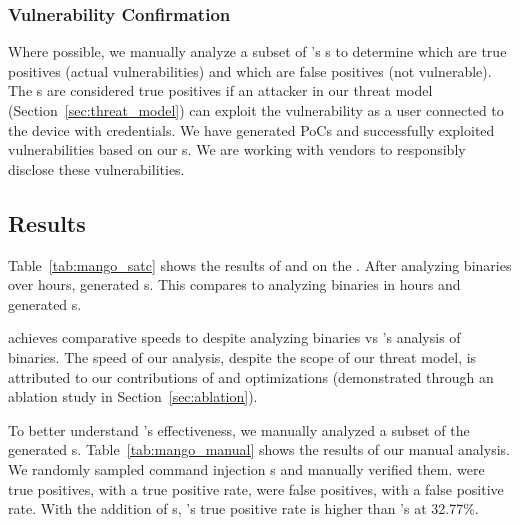 \subsubsection{Vulnerability Confirmation}

Where possible, we manually analyze a subset of \mango's \trupoc{}s to determine which are true positives (actual vulnerabilities) and which are false positives (not vulnerable).
The \trupoc{}s are considered true positives if an attacker in our threat model (Section~\ref{sec:threat_model}) can exploit the vulnerability as a user connected to the device with credentials.
We have generated PoCs and successfully exploited \MangoPoCnum vulnerabilities based on our \trupoc{}s.
We are working with vendors to responsibly disclose these vulnerabilities.

\subsection{\karonteDataset Results}

Table~\ref{tab:mango_satc} shows the results of \mango and \satc on the \karonteDataset.
After analyzing \mangoCompTotalAnalyzedBins binaries over \mangoCompTotalTimeHours hours, \mango generated \mangoCompTotalAlerts \trupoc{}s.
This compares to \satc analyzing \satcAnalyzedBinaries binaries in \satcCompTotalTimeHours hours and generated \satcCompTotalAlerts \trupoc{}s.

\toolname achieves comparative speeds to \satc despite analyzing \mangoKaronteBinaries binaries vs \satc's analysis of \satcAnalyzedBinaries binaries.
The speed of our analysis, despite the scope of our threat model, is attributed to our contributions of \assumed and \rev optimizations (demonstrated through an ablation study in Section~\ref{sec:ablation}).

To better understand \mango{}'s effectiveness, we manually analyzed a subset of the generated \trupoc{}s.
Table~\ref{tab:mango_manual} shows the results of our manual analysis.
We randomly sampled \manualAnalysisCmdInjTotal  \mango command injection \trupoc{}s and manually verified them.
\manualAnalysisCmdInjTrueTP were true positives, with a \manualAnalysisCmdInjTPRatio true positive rate, \manualAnalysisCmdInjTrueFP were false positives, with a \manualAnalysisCmdInjFPRatio false positive rate.
With the addition of \trupoc{}s, \mango's \manualAnalysisCmdInjTPRatio true positive rate is higher than \satc's at 32.77\%.

